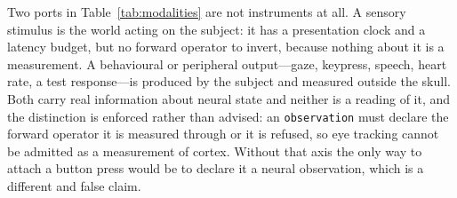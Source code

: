 Two ports in Table~\ref{tab:modalities} are not instruments at all. A sensory
stimulus is the world acting on the subject: it has a presentation clock and a
latency budget, but no forward operator to invert, because nothing about it is
a measurement. A behavioural or peripheral output---gaze, keypress, speech,
heart rate, a test response---is produced by the subject and measured outside
the skull. Both carry real information about neural state and neither is a
reading of it, and the distinction is enforced rather than advised: an
\texttt{observation} must declare the forward operator it is measured through
or it is refused, so eye tracking cannot be admitted as a measurement of
cortex. Without that axis the only way to attach a button press would be to
declare it a neural observation, which is a different and false claim.

